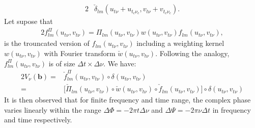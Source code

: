 \vspace{-.5cm}
\begin{alignat}{2}
				    &\check{\delta}_{lm}(u_{t\nu}+u_{t_c\nu_c}, v_{t\nu}+v_{t_c\nu_c}).
\end{alignat}
Let supose that 
\begin{alignat*}{2}
f^{\Pi}_{lm}(u_{t\nu},v_{t\nu})=\Pi_{lm}(u_{t\nu},v_{t\nu})w(u_{t\nu},v_{t\nu})f^{}_{lm}(u_{t\nu},v_{t\nu}),
\end{alignat*}
is the trouncated version of  $f_{lm}(u_{t\nu},v_{t\nu})$ including a weighting kernel $w(u_{t\nu},v_{t\nu})$ with Fourier 
transform $\check{w}(u_{t\nu},v_{t\nu})$. Following the 
analogy, $f^{\Pi}_{lm}(u_{t\nu},v_{t\nu})$ is of size $\Delta t \times \Delta \nu$.
We have: %
\begin{alignat}{2}
V_{\nu}(\mathbf{b}) =& \check{f}^{\Pi}_{lm}(u_{t\nu},v_{t\nu})\circ\delta(u_{t\nu},v_{t\nu})\\
		    =& \Bigg[\check{\Pi}_{lm}(u_{t\nu},v_{t\nu})\circ \check{w}(u_{t\nu},v_{t\nu})\circ \check{f}^{}_{lm}(u_{t\nu},v_{t\nu})\Bigg]\circ \delta(u_{t\nu},v_{t\nu})\label{eq:5}
\end{alignat}
It is then observed that for finite frequency and time range, the complex phase varies linearly within the range
$\Delta \Phi = −2\pi t\Delta \nu$ and $\Delta \Psi= −2\pi\nu\Delta t$ in frequency and time respectively.


